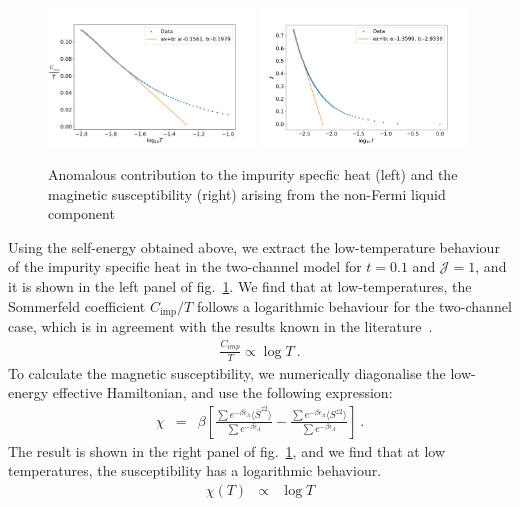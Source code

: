 \documentclass[10pt]{iopart}
\begin{document}
\begin{figure}[!htb]
\centering
\includegraphics[width=0.49\textwidth]{FINALfittedCvt0p1.png}
\includegraphics[width=0.49\textwidth]{NFLChilog0p1}
\caption{Anomalous contribution to the impurity specfic heat (left) and the maginetic susceptibility (right) arising from the non-Fermi liquid component}
\label{fig:Cv_imp}
\end{figure}
Using the self-energy obtained above, we extract the low-temperature behaviour of the impurity specific heat in the two-channel model for $t=0.1$ and $\mathcal{J}=1$, and it is shown in the left panel of fig.~\ref{fig:Cv_imp}. We find that at low-temperatures, the Sommerfeld coefficient \(C_\text{imp}/T\) follows a logarithmic behaviour for the two-channel case, which is in agreement with the results known in the literature~\cite{affleck_1991_overscreen,affleck_ludwig_1991,affleck_pang_cox_1992,affleck1993exact,
parcollet_olivier_large_N,affleck_2005,emery_kivelson,clarke_giamarchi_1993,zarand_2000,
vondelft_prl_1998,schofield_1997,bullaNRGreview,affleck_pang_cox_1992,pang_cox_1991,
andrei_destri_1984,Tsvelick1984,Tsvelick_1985,andrei_jerez_1995,zarand_costi_2002,
sengupta_1994,fabrizio_nozieres_1995,Coleman_tsvelik,fabrizio_gogolin_1995}.
\begin{eqnarray}
\frac{C_{imp}}{T} \propto \log T~.
\end{eqnarray}
To calculate the magnetic susceptibility, we numerically diagonalise the low-energy effective Hamiltonian, and use the following expression:
\begin{eqnarray}
\chi &=& \beta\left[\frac{\sum e^{-\beta \bar{\epsilon}_{\Lambda}} \langle \bar{S}^{z2} \rangle}{\sum e^{-\beta \bar{\epsilon}_{\Lambda}} } -\frac{\sum e^{-\beta \epsilon_{\Lambda}} \langle S^{z2 }\rangle }{\sum e^{-\beta \epsilon_{\Lambda}} } \right] ~.
\end{eqnarray}
The result is shown in the right panel of fig.~\ref{fig:Cv_imp}, and we find that at low temperatures, the susceptibility has a logarithmic behaviour.
\begin{eqnarray}
\chi(T) &\propto& \log T
\end{eqnarray}
\end{document}
